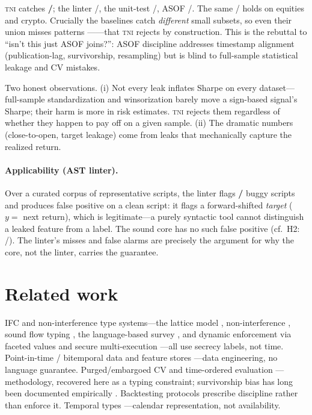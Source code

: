 \documentclass[11pt]{article}
\newcommand{\tni}{\textsc{tni}}
\theoremstyle{plain}
\theoremstyle{definition}
\begin{document}


\tni{} catches \textbf{\benchTni/\benchN}; the linter \benchLint/\benchN, the
unit-test \benchUnit/\benchN, ASOF \benchAsof/\benchN. The same \benchTni/\benchN{}
holds on equities and crypto. Crucially the baselines catch \emph{different}
small subsets, so even their union misses \benchMissed{} patterns
---\benchMissedList---that \tni{} rejects by construction. This is the rebuttal
to ``isn't this just ASOF joins?'': ASOF discipline addresses timestamp
alignment (publication-lag, survivorship, resampling) but is blind to full-sample
statistical leakage and CV mistakes.




Two honest observations. (i) Not every leak inflates Sharpe on every dataset---
full-sample standardization and winsorization barely move a sign-based signal's
Sharpe; their harm is more in risk estimates. \tni{} rejects them regardless of
whether they happen to pay off on a given sample. (ii) The dramatic numbers
(close-to-open, target leakage) come from leaks that mechanically capture the
realized return.

\paragraph{Applicability (AST linter).}
Over a curated corpus of representative scripts, the linter flags
\textbf{\lintTP/\lintBuggy} buggy scripts and produces \lintFP{} false positive
on a clean script: it flags a forward-shifted \emph{target} ($y=$ next return),
which is legitimate---a purely syntactic tool cannot distinguish a leaked feature
from a label. The sound core has no such false positive (cf.\ H2: \htwoN/\htwoN).
The linter's misses and false alarms are precisely the argument for why the core,
not the linter, carries the guarantee.

\section{Related work}\label{sec:related}

IFC and non-interference type systems---the lattice model
\citep{denning1976lattice}, non-interference \citep{goguen1982security}, sound
flow typing \citep{volpano1996sound}, the language-based survey
\citep{sabelfeld2003language}, and dynamic enforcement via faceted values
\citep{austin2012multiple} and secure multi-execution
\citep{devriese2010noninterference}---all use secrecy labels, not time.
Point-in-time / bitemporal data and feature stores \citep{feast}---data
engineering, no language guarantee. Purged/embargoed CV
\citep{lopezdeprado2018advances} and time-ordered evaluation
\citep{bergmeir2012use}---methodology, recovered here as a typing constraint;
survivorship bias has long been documented empirically
\citep{brown1992survivorship}. Backtesting protocols
\citep{arnott2019backtesting} prescribe discipline rather than enforce it.
Temporal types \citep{bry2005catts,tc39temporal}---calendar representation, not
availability.
\end{document}
